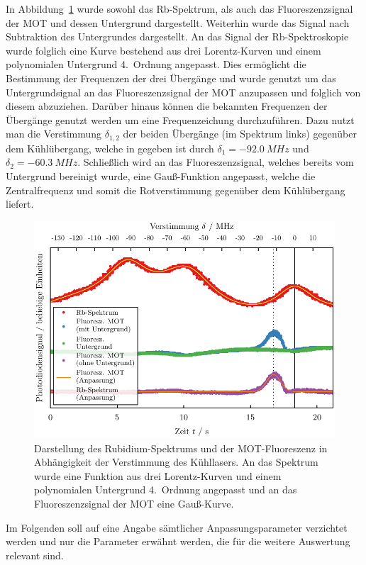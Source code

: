 \documentclass[11pt, a4paper]{article}
\numberwithin{equation}{section}
\begin{document}
In Abbildung~\ref{fig:detuning_cooling} wurde sowohl das Rb-Spektrum, als auch das Fluoreszenzsignal der MOT und dessen Untergrund dargestellt.
Weiterhin wurde das Signal nach Subtraktion des Untergrundes dargestellt.
An das Signal der Rb-Spektroskopie wurde folglich eine Kurve bestehend aus drei Lorentz-Kurven und einem polynomialen Untergrund 4.\ Ordnung angepasst.
Dies ermöglicht die Bestimmung der Frequenzen der drei Übergänge und wurde genutzt um das Untergrundsignal an das Fluoreszenzsignal der MOT anzupassen und folglich von diesem abzuziehen.
Darüber hinaus können die bekannten Frequenzen der Übergänge genutzt werden um eine Frequenzeichung durchzuführen.
Dazu nutzt man die Verstimmung $\delta_{1,2}$ der beiden Übergänge (im Spektrum links) gegenüber dem Kühlübergang, welche in \cite{script} gegeben ist durch $\delta_1 = \SI{-92.0}{MHz}$ und $\delta_2 = \SI{-60.3}{MHz}$.
Schließlich wird an das Fluoreszenzsignal, welches bereits vom Untergrund bereinigt wurde, eine Gauß-Funktion angepasst, welche die Zentralfrequenz und somit die Rotverstimmung gegenüber dem Kühlübergang liefert.
\begin{figure}[h]
	\centering
	\includegraphics{./figures/detuning_cooling.pdf}
	\caption{Darstellung des Rubidium-Spektrums und der MOT-Fluoreszenz in Abhängigkeit der Verstimmung des Kühllasers. An das Spektrum wurde eine Funktion aus drei Lorentz-Kurven und einem polynomialen Untergrund 4.\ Ordnung angepasst und an das Fluoreszenzsignal der MOT eine Gauß-Kurve.}
	\label{fig:detuning_cooling}
\end{figure}
Im Folgenden soll auf eine Angabe sämtlicher Anpassungsparameter verzichtet werden und nur die Parameter erwähnt werden, die für die weitere Auswertung relevant sind.
\end{document}

